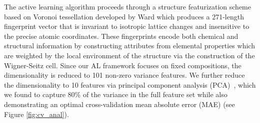 %
The active learning algorithm proceeds through a structure featurization scheme based on Voronoi tessellation developed by Ward  \cite{Ward2017} which produces a \num{271}-length fingerprint vector that is invariant to isotropic lattice changes and insensitive to the precise atomic coordinates.
%
These fingerprints encode both chemical and structural information by constructing attributes from elemental properties which are weighted by the local environment of the structure via the construction of the Wigner-Seitz cell.
\cite{Wigner1933}
%
Since our AL framework focuses on fixed compositions, the dimensionality is reduced to \num{101} non-zero variance features.
%
We further reduce the dimensionality to 10 features via principal component analysis (PCA)~\cite{Tipping1999},
which we found to capture 80\% of the variance in the full feature set while also demonstrating an optimal cross-validation mean absolute error (MAE) (see Figure \ref{fig:cv_anal}).
%
%


